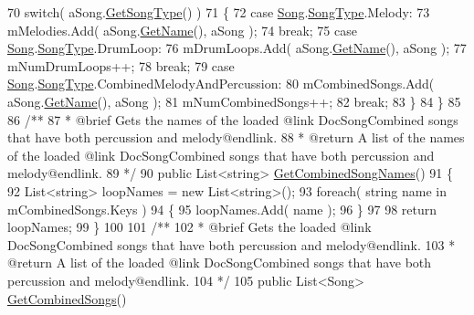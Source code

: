 \begin{DoxyCodeInclude}
70         \textcolor{keywordflow}{switch}( aSong.\hyperlink{group___song_pub_func_gabae5b5d8f727b2d9da7867a99347f86b}{GetSongType}() )
71         \{
72             \textcolor{keywordflow}{case} \hyperlink{class_song}{Song}.\hyperlink{group___song_enums_gae681a1f001333e39fc1cb4fea97bfe1b}{SongType}.Melody:
73                 mMelodies.Add( aSong.\hyperlink{group___song_pub_func_ga705c433f2bfb5aede337698144b23c8b}{GetName}(), aSong );
74                 \textcolor{keywordflow}{break};
75             \textcolor{keywordflow}{case} \hyperlink{class_song}{Song}.\hyperlink{group___song_enums_gae681a1f001333e39fc1cb4fea97bfe1b}{SongType}.DrumLoop:
76                 mDrumLoops.Add( aSong.\hyperlink{group___song_pub_func_ga705c433f2bfb5aede337698144b23c8b}{GetName}(), aSong );
77                 mNumDrumLoops++;
78                 \textcolor{keywordflow}{break};
79             \textcolor{keywordflow}{case} \hyperlink{class_song}{Song}.\hyperlink{group___song_enums_gae681a1f001333e39fc1cb4fea97bfe1b}{SongType}.CombinedMelodyAndPercussion:
80                 mCombinedSongs.Add( aSong.\hyperlink{group___song_pub_func_ga705c433f2bfb5aede337698144b23c8b}{GetName}(), aSong );
81                 mNumCombinedSongs++;
82                 \textcolor{keywordflow}{break};
83         \}
84     \}
85 \textcolor{comment}{}
86 \textcolor{comment}{    /**}
87 \textcolor{comment}{     * @brief Gets the names of the loaded @link DocSongCombined songs that have both percussion and
       melody@endlink.}
88 \textcolor{comment}{     * @return A list of the names of the loaded @link DocSongCombined songs that have both percussion and
       melody@endlink.}
89 \textcolor{comment}{    */}
90     \textcolor{keyword}{public} List<string> \hyperlink{group___s_m_pub_func_ga87bd14c75666b13bd02510c5b7080784}{GetCombinedSongNames}()
91     \{
92         List<string> loopNames = \textcolor{keyword}{new} List<string>();
93         \textcolor{keywordflow}{foreach}( \textcolor{keywordtype}{string} name \textcolor{keywordflow}{in} mCombinedSongs.Keys )
94         \{
95             loopNames.Add( name );
96         \}
97 
98         \textcolor{keywordflow}{return} loopNames;
99     \}
100 \textcolor{comment}{}
101 \textcolor{comment}{    /**}
102 \textcolor{comment}{     * @brief Gets the loaded @link DocSongCombined songs that have both percussion and melody@endlink.}
103 \textcolor{comment}{     * @return A list of the loaded @link DocSongCombined songs that have both percussion and
       melody@endlink.}
104 \textcolor{comment}{    */}
105     \textcolor{keyword}{public} List<Song> \hyperlink{group___s_m_pub_func_ga413595693011bd6021dfd6eb941bf0e6}{GetCombinedSongs}()

\end{DoxyCodeInclude}
